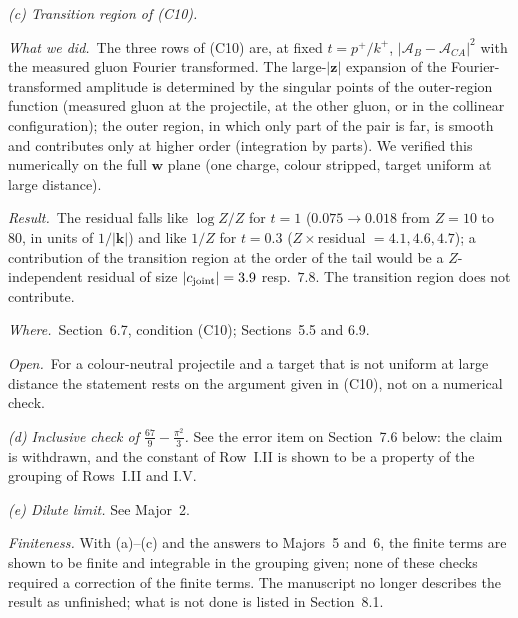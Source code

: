 \documentclass[a4paper,11pt]{article}
\def\v#1{\mathbf{#1}}
\newcommand{\done}{\par\noindent\emph{What we did.}\ }
\newcommand{\result}{\par\noindent\emph{Result.}\ }
\newcommand{\where}{\par\noindent\emph{Where.}\ }
\newcommand{\open}{\par\noindent\emph{Open.}\ }
\begin{document}
\emph{(c) Transition region of (C10).}
\done The three rows of (C10) are, at fixed $t=p^+/k^+$, $|\mathcal A_B-\mathcal A_{CA}|^2$ with the measured gluon Fourier transformed. The large-$|\v z|$ expansion of the Fourier-transformed amplitude is determined by the singular points of the outer-region function (measured gluon at the projectile, at the other gluon, or in the collinear configuration); the outer region, in which only part of the pair is far, is smooth and contributes only at higher order (integration by parts). We verified this numerically on the full $\v w$ plane (one charge, colour stripped, target uniform at large distance).
\result The residual falls like $\log Z/Z$ for $t=1$ ($0.075\to0.018$ from $Z=10$ to $80$, in units of $1/|\v k|$) and like $1/Z$ for $t=0.3$ ($Z\times$residual $=4.1,4.6,4.7$); a contribution of the transition region at the order of the tail would be a $Z$-independent residual of size $|c_{\rm joint}|=3.9$ resp.\ $7.8$. The transition region does not contribute.
\where Section~6.7, condition (C10); Sections~5.5 and 6.9.
\open For a colour-neutral projectile and a target that is not uniform at large distance the statement rests on the argument given in (C10), not on a numerical check.

\emph{(d) Inclusive check of $\frac{67}{9}-\frac{\pi^2}{3}$.} See the error item on Section~7.6 below: the claim is withdrawn, and the constant of Row~I.II is shown to be a property of the grouping of Rows~I.II and I.V.

\emph{(e) Dilute limit.} See Major~2.

\emph{Finiteness.} With (a)--(c) and the answers to Majors~5 and~6, the finite terms are shown to be finite and integrable in the grouping given; none of these checks required a correction of the finite terms. The manuscript no longer describes the result as unfinished; what is not done is listed in Section~8.1.
\end{document}
